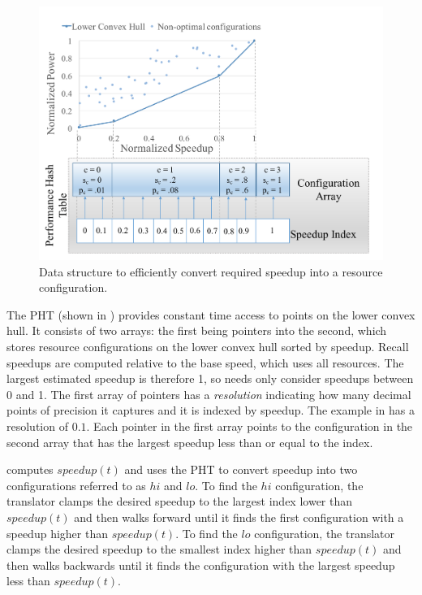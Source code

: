 \begin{figure}
\includegraphics[width=\columnwidth]{figures/performance-hash-table.pdf}
\caption{Data structure to efficiently convert required speedup into a
  resource configuration.}
  \label{fig:pht}
\end{figure}

The PHT (shown in ) provides constant time access to
points on the lower convex hull.  It consists of two arrays: the first
being pointers into the second, which stores resource configurations
on the lower convex hull sorted by speedup.  Recall speedups are
computed relative to the base speed, which uses all resources.  The
largest estimated speedup is therefore 1, so \SYSTEM{} needs only
consider speedups between 0 and 1.  The first array of pointers has a
\emph{resolution} indicating how many decimal points of precision it
captures and it is indexed by speedup.  The example in
 has a resolution of $0.1$.  Each pointer in the first
array points to the configuration in the second array that has the
largest speedup less than or equal to the index.

\SYSTEM{} computes $speedup(t)$ and uses the PHT to convert speedup
into two configurations referred to as $hi$ and $lo$.  To find the
$hi$ configuration, the translator clamps the desired speedup to the
largest index lower than $speedup(t)$ and then walks forward until it
finds the first configuration with a speedup higher than $speedup(t)$.
To find the $lo$ configuration, the translator clamps the desired
speedup to the smallest index higher than $speedup(t)$ and then walks
backwards until it finds the configuration with the largest speedup
less than $speedup(t)$.

